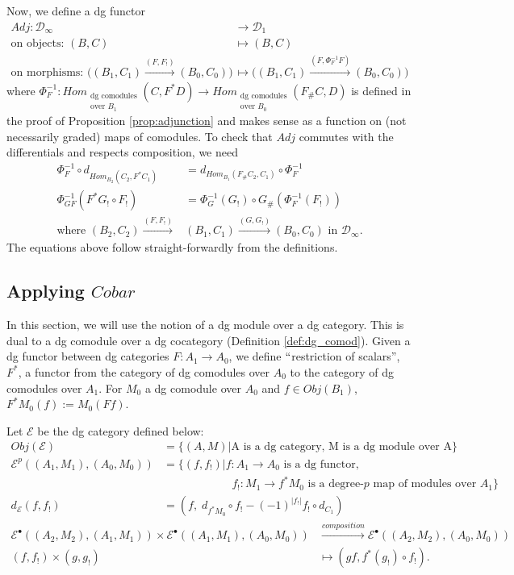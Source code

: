 Now, we define a dg functor 
\begin{align*}
Adj: \mathcal{D}_\infty 
&\to 
\mathcal{D}_1\\
\textrm{on objects: }(B,C)
& \mapsto
(B,C)\\
\textrm{on morphisms: }\bigg((B_1, C_1) 
  \xrightarrow{(F, F_!)} (B_0,C_0)\bigg)
& \mapsto
\bigg((B_1, C_1) 
  \xrightarrow{(F, \Phi^{-1}_FF)} 
  (B_0,C_0)\bigg)
\end{align*}
where 
$\Phi^{-1}_F:Hom_{\substack{
  \textrm{dg comodules}\\\textrm{over $B_1$}}}
  (C,F^*D) 
\to 
Hom_{\substack{
  \textrm{dg comodules}\\\textrm{over $B_0$}}}
  (F_\#C,D)$
is defined in the proof of Proposition 
\ref{prop:adjunction} and makes sense as 
a function on (not necessarily graded) 
maps of comodules. To check that $Adj$ 
commutes with the differentials and 
respects composition, we need
\begin{align*}
\Phi^{-1}_F \circ d_{Hom_{B_2}(C_2, F^*C_1)}
&= 
d_{Hom_{B_1}(F_\#C_2, C_1)} \circ \Phi^{-1}_F\\
\Phi^{-1}_{GF}(F^*G_! \circ F_!)
&=
\Phi^{-1}_G(G_!) \circ G_\#(\Phi^{-1}_F(F_!))\\
\textrm{where }
(B_2, C_2) 
  \xrightarrow{(F, F_!)} &(B_1,C_1)
  \xrightarrow{(G, G_!)} (B_0,C_0)
  \textrm{ in }\mathcal{D}_\infty.
\end{align*}
The equations above follow straight-forwardly 
from the definitions.
%
%
\subsection{Applying $Cobar$}
\label{sec:cobar}
In this section, we will use the notion of 
a dg module over a dg category. This is 
dual to a dg comodule over 
a dg cocategory (Definition \ref{def:dg_comod}). 
Given a dg functor between dg categories 
$F:A_1 \to A_0$, we define $``$restriction 
of scalars'', $F^*$, a functor from 
the category of dg comodules over $A_0$ 
to the category of dg comodules over $A_1$. 
For $M_0$ a dg comodule over $A_0$ and $f \in 
Obj(B_1)$, $F^*M_0(f):=M_0(Ff)$.

Let $\mathcal{E}$ be the dg category defined 
below:
\begin{align*}
Obj(\mathcal{E}) 
&= 
\{(A,M) |
  \textrm{A is a dg category, 
  M is a dg module over A}\} \\
\mathcal{E}^p((A_1, M_1), (A_0, M_0))  
&= 
\{(f, f_!) | f:A_1 \to A_0 
  \textrm{ is a dg functor,}\\
& \phantom{{}=[(f, f_!)]{}}  
  f_!:M_1 \to f^*M_0 
  \textrm{ is a degree-$p$ map of modules over }
  A_1\}\\
d_{\mathcal{E}}(f,f_!)
&=
(f,\; d_{f^*M_0} \circ f_! - (-1)^{|f_!|} 
f_! \circ d_{C_1})  
\end{align*}
\begin{align*}  
\mathcal{E}^\bullet((A_2, M_2), (A_1, M_1)) \times  
\mathcal{E}^\bullet((A_1, M_1), (A_0, M_0))
&\xrightarrow{composition}
\mathcal{E}^\bullet((A_2, M_2), (A_0, M_0))\\
(f,f_!) \times (g, g_!)
&\mapsto
(gf, f^*(g_!)\circ f_!).
\end{align*}

